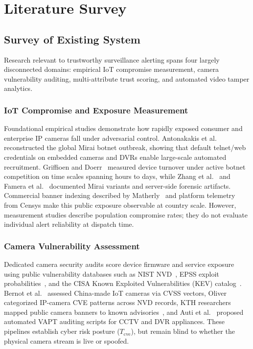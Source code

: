 \chapter{Literature Survey}

\section{Survey of Existing System}
Research relevant to trustworthy surveillance alerting spans four largely disconnected domains: empirical IoT compromise measurement, camera vulnerability auditing, multi-attribute trust scoring, and automated video tamper analytics.

\subsection{IoT Compromise and Exposure Measurement}
Foundational empirical studies demonstrate how rapidly exposed consumer and enterprise IP cameras fall under adversarial control. Antonakakis et al.~\cite{antonakakis2017mirai} reconstructed the global Mirai botnet outbreak, showing that default telnet/web credentials on embedded cameras and DVRs enable large-scale automated recruitment. Griffioen and Doerr~\cite{griffioen2020mirai} measured device turnover under active botnet competition on time scales spanning hours to days, while Zhang et al.~\cite{zhang2020forensics} and Famera et al.~\cite{famera2025mirai} documented Mirai variants and server-side forensic artifacts. Commercial banner indexing described by Matherly~\cite{matherly2015shodan} and platform telemetry from Censys make this public exposure observable at country scale. However, measurement studies describe population compromise rates; they do not evaluate individual alert reliability at dispatch time.

\subsection{Camera Vulnerability Assessment}
Dedicated camera security audits score device firmware and service exposure using public vulnerability databases such as NIST NVD~\cite{nvd}, EPSS exploit probabilities~\cite{jacobs2021epss}, and the CISA Known Exploited Vulnerabilities (KEV) catalog~\cite{cisakev}. Bernot et al.~\cite{bernot2025cctv} assessed China-made IoT cameras via CVSS vectors, Oliver~\cite{oliver2025ipcam} categorized IP-camera CVE patterns across NVD records, KTH researchers mapped public camera banners to known advisories~\cite{kth2018cameras}, and Auti et al.~\cite{auti2025vapt} proposed automated VAPT auditing scripts for CCTV and DVR appliances. These pipelines establish cyber risk posture ($T_{\mathrm{cve}}$), but remain blind to whether the physical camera stream is live or spoofed.

